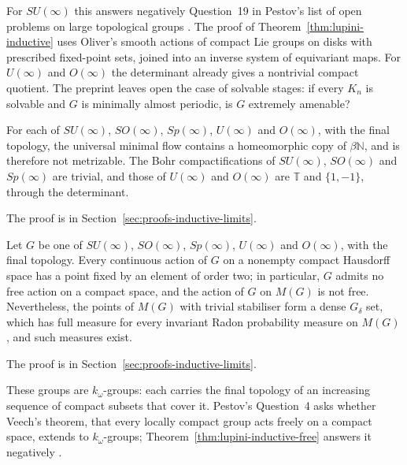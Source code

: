 \begin{remark}\label{rem:lupini-inductive}
For $SU(\infty)$ this answers negatively Question~19 in Pestov's list of open
problems on large topological groups \cite{LupiniInductive2026}. The proof of
Theorem~\ref{thm:lupini-inductive} uses Oliver's smooth actions of compact Lie
groups on disks with prescribed fixed-point sets, joined into an inverse
system of equivariant maps. For $U(\infty)$ and $O(\infty)$ the determinant
already gives a nontrivial compact quotient. The preprint leaves open the
case of solvable stages: if every $K_n$ is solvable and $G$ is minimally
almost periodic, is $G$ extremely amenable?
\end{remark}

\begin{theorem}\label{thm:lupini-inductive-umf}
For each of $SU(\infty)$, $SO(\infty)$, $Sp(\infty)$, $U(\infty)$ and
$O(\infty)$, with the final topology, the universal minimal flow contains a
homeomorphic copy of $\beta\mathbb{N}$, and is therefore not metrizable. The
Bohr compactifications of $SU(\infty)$, $SO(\infty)$ and $Sp(\infty)$ are
trivial, and those of $U(\infty)$ and $O(\infty)$ are $\mathbb{T}$ and
$\{1,-1\}$, through the determinant.
\end{theorem}

The proof is in Section~\ref{sec:proofs-inductive-limits}.

\begin{theorem}\label{thm:lupini-inductive-free}
Let $G$ be one of $SU(\infty)$, $SO(\infty)$, $Sp(\infty)$, $U(\infty)$ and
$O(\infty)$, with the final topology. Every continuous action of $G$ on a
nonempty compact Hausdorff space has a point fixed by an element of order
two; in particular, $G$ admits no free action on a compact space, and the
action of $G$ on $M(G)$ is not free. Nevertheless, the points of $M(G)$ with
trivial stabiliser form a dense $G_\delta$ set, which has full measure for
every invariant Radon probability measure on $M(G)$, and such measures exist.
\end{theorem}

The proof is in Section~\ref{sec:proofs-inductive-limits}.

\begin{remark}\label{rem:lupini-inductive-free}
These groups are $k_\omega$-groups: each carries the final topology of an
increasing sequence of compact subsets that cover it. Pestov's Question~4 asks whether
Veech's theorem, that every locally compact group acts freely on a compact
space, extends to $k_\omega$-groups; Theorem~\ref{thm:lupini-inductive-free}
answers it negatively \cite{LupiniInductive2026}.
\end{remark}

